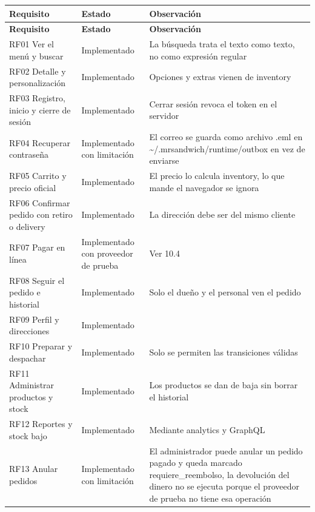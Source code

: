 \documentclass[10pt,letterpaper]{article}
\begin{document}
{\footnotesize
\begin{longtable}{|P{\tabcolsep\relax}|P{\tabcolsep\relax}|P{\tabcolsep\relax}|}
\hline
\textbf{Requisito} & \textbf{Estado} & \textbf{Observación} \\ \hline
\endfirsthead
\hline
\textbf{Requisito} & \textbf{Estado} & \textbf{Observación} \\ \hline
\endhead
RF01 Ver el menú y buscar & Implementado & La búsqueda trata el texto como texto, no como expresión regular \\ \hline
RF02 Detalle y personalización & Implementado & Opciones y extras vienen de inventory \\ \hline
RF03 Registro, inicio y cierre de sesión & Implementado & Cerrar sesión revoca el token en el servidor \\ \hline
RF04 Recuperar contraseña & Implementado con limitación & El correo se guarda como archivo .eml en \textasciitilde{}/\allowbreak{}.mrsandwich/\allowbreak{}runtime/\allowbreak{}outbox en vez de enviarse \\ \hline
RF05 Carrito y precio oficial & Implementado & El precio lo calcula inventory, lo que mande el navegador se ignora \\ \hline
RF06 Confirmar pedido con retiro o delivery & Implementado & La dirección debe ser del mismo cliente \\ \hline
RF07 Pagar en línea & Implementado con proveedor de prueba & Ver 10.4 \\ \hline
RF08 Seguir el pedido e historial & Implementado & Solo el dueño y el personal ven el pedido \\ \hline
RF09 Perfil y direcciones & Implementado &  \\ \hline
RF10 Preparar y despachar & Implementado & Solo se permiten las transiciones válidas \\ \hline
RF11 Administrar productos y stock & Implementado & Los productos se dan de baja sin borrar el historial \\ \hline
RF12 Reportes y stock bajo & Implementado & Mediante analytics y GraphQL \\ \hline
RF13 Anular pedidos & Implementado con limitación & El administrador puede anular un pedido pagado y queda marcado requiere\_\allowbreak{}reembolso, la devolución del dinero no se ejecuta porque el proveedor de prueba no tiene esa operación \\ \hline
\end{longtable}}
\end{document}
